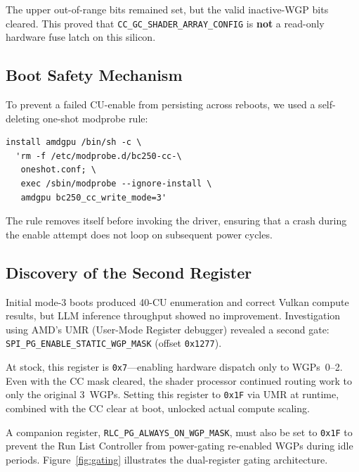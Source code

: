 \documentclass[11pt,twocolumn]{article}
\begin{document}
The upper out-of-range bits remained set, but the valid inactive-WGP bits cleared. This proved that \texttt{CC\_GC\_SHADER\_ARRAY\_CONFIG} is \textbf{not} a read-only hardware fuse latch on this silicon.

\subsection{Boot Safety Mechanism}

To prevent a failed CU-enable from persisting across reboots, we used a self-deleting one-shot modprobe rule:

\begin{lstlisting}
install amdgpu /bin/sh -c \
  'rm -f /etc/modprobe.d/bc250-cc-\
   oneshot.conf; \
   exec /sbin/modprobe --ignore-install \
   amdgpu bc250_cc_write_mode=3'
\end{lstlisting}

The rule removes itself before invoking the driver, ensuring that a crash during the enable attempt does not loop on subsequent power cycles.

\subsection{Discovery of the Second Register}

Initial mode-3 boots produced 40-CU enumeration and correct Vulkan compute results, but LLM inference throughput showed no improvement. Investigation using AMD's UMR (User-Mode Register debugger) revealed a second gate: \texttt{SPI\_PG\_ENABLE\_STATIC\_WGP\_MASK} (offset \texttt{0x1277}).

At stock, this register is \texttt{0x7}---enabling hardware dispatch only to WGPs~0--2. Even with the CC mask cleared, the shader processor continued routing work to only the original 3~WGPs. Setting this register to \texttt{0x1F} via UMR at runtime, combined with the CC clear at boot, unlocked actual compute scaling.

A companion register, \texttt{RLC\_PG\_ALWAYS\_ON\_WGP\_MASK}, must also be set to \texttt{0x1F} to prevent the Run List Controller from power-gating re-enabled WGPs during idle periods. Figure~\ref{fig:gating} illustrates the dual-register gating architecture.
\end{document}
